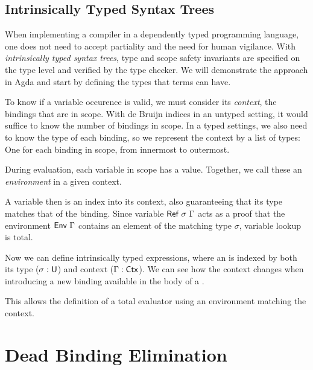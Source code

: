 \documentclass[11pt,a4paper]{article}
\begin{document}
\subsection{Intrinsically Typed Syntax Trees}

When implementing a compiler in a dependently typed programming language,
one does not need to accept partiality and the need for human vigilance.
With \emph{intrinsically typed syntax trees}, type and scope safety invariants
are specified on the type level and verified by the type checker.
We will demonstrate the approach in Agda and start by defining the types that terms can have.

\CodeLangTypes

To know if a variable occurence is valid, we must consider its \emph{context},
the bindings that are in scope.
With de Bruijn indices in an untyped setting, it would suffice to know the number of bindings in scope.
In a typed settings, we also need to know the type of each binding,
so we represent the context by a list of types: One for each binding in scope, from innermost to outermost.

\CodeLangCtx

During evaluation, each variable in scope has a value.
Together, we call these an \emph{environment} in a given context.

\CodeLangEnv

A variable then is an index into its context,
also guaranteeing that its type matches that of the binding.
Since variable $\AgdaDatatype{Ref}\ \sigma\ \Gamma$ acts as a proof that
the environment $\AgdaDatatype{Env}\ \Gamma$ contains an element of the matching type $\sigma$,
variable lookup is total.

\CodeLangRef

Now we can define intrinsically typed expressions,
where an  is indexed by both
its type ($\sigma : \AgdaDatatype{U}$)
and context ($\Gamma : \AgdaDatatype{Ctx}$).
We can see how the context changes when introducing a new binding
available in the body of a .

\CodeLangExpr

This allows the definition of a total evaluator
using an environment matching the context.

\CodeLangSemantics


\section{Dead Binding Elimination}
\end{document}
